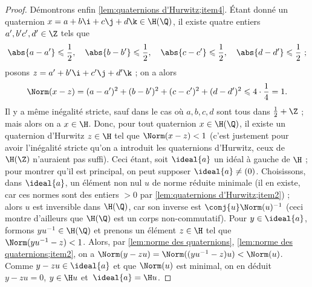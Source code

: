 \documentclass[11pt, useosf,
  title in boldface,
  theorem in new line,
  theorem numbering = section,
  number theorems separately,
]{simplivre}
\begin{document}
\begin{proof}
        Démontrons enfin \ref{lem:quaternions d'Hurwitz;item4}. Étant donné un quaternion \( x = a+b\i+c\j+d\k \in \H(\Q) \), il existe quatre entiers \( a',b'c',d' \in \Z \) tels que
        \[
            \abs{a-a'} \leqslant \frac{1}{2}, \quad
            \abs{b-b'} \leqslant \frac{1}{2}, \quad
            \abs{c-c'} \leqslant \frac{1}{2}, \quad
            \abs{d-d'} \leqslant \frac{1}{2} ~;
        \]
        posons \( z = a'+b'\i+c'\j+d'\k \) ; on a alors
        \[
            \Norm(x-z) = (a-a')^2 + (b-b')^2 + (c-c')^2 + (d-d')^2 \leqslant 4 \cdot \frac{1}{4} = 1.
        \]
        Il y a même inégalité stricte, sauf dans le cas où \( a,b,c,d \) sont tous dans \( \frac{1}{2} + \Z \) ; mais alors on a \( x \in \H \). Donc, pour tout quaternion \( x \in \H(\Q) \), il existe un quaternion d'Hurwitz \( z \in \H \) tel que \( \Norm(x-z) < 1 \) (c'est justement pour avoir l'inégalité stricte qu'on a introduit les quaternions d'Hurwitz, ceux de \( \H(\Z) \) n'auraient pas suffi). Ceci étant, soit \( \ideal{a} \) un idéal à gauche de \( \H \) ; pour montrer qu'il est principal, on peut supposer \( \ideal{a} \neq (0) \). Choisissons, dans \( \ideal{a} \), un élément non nul \( u \) de norme réduite minimale (il en existe, car ces normes sont des entiers \( > 0 \) par \ref{lem:quaternions d'Hurwitz;item2}) ; alors \( u \) est inversible dans \( \H(\Q) \), car son inverse est \( \conj{u} \Norm(u)^{-1} \) (ceci montre d'ailleurs que \( \H(\Q) \) est un corps non-commutatif). Pour \( y \in \ideal{a} \), formons \( y u^{-1} \in \H(\Q) \) et prenons un élément \( z \in \H \) tel que \( \Norm(yu^{-1}-z) < 1 \). Alors, par \cref{lem:norme des quaternions}, \ref{lem:norme des quaternions;item2}, on a \( \Norm(y-zu) = \Norm((yu^{-1}-z)u) < \Norm(u) \). Comme \( y-zu \in \ideal{a} \) et que \( \Norm(u) \) est minimal, on en déduit \( y-zu = 0 \), \( y \in \H u \) et~\( \ideal{a} = \H u \).
    \end{proof}
\end{document}
